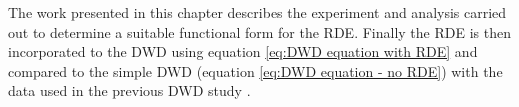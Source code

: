 The work presented in this chapter describes the experiment and analysis carried out to determine a suitable functional form for the RDE.
Finally the RDE is then incorporated to the DWD using equation \ref{eq:DWD equation with RDE} and compared to the simple DWD (equation \ref{eq:DWD equation - no RDE}) with the data used in the previous DWD study \cite{zeldin2013dwd}.
